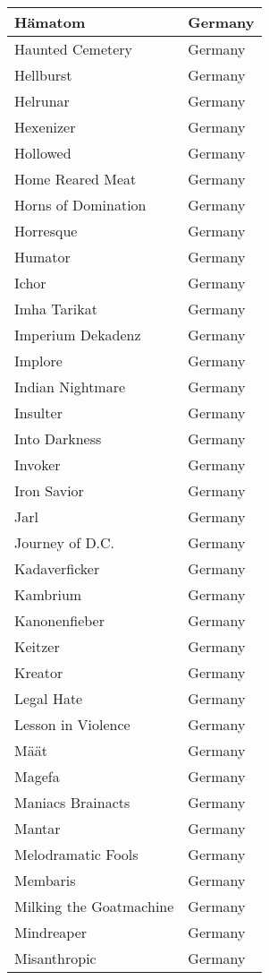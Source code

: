 \documentclass[12pt, a4paper, twoside]{report}
\begin{document}
\begin{center}
\begin{longtable}{|p{5cm}|p{5cm}|}
Hämatom & Germany \\ \hline
Haunted Cemetery & Germany \\ \hline
Hellburst & Germany \\ \hline
Helrunar & Germany \\ \hline
Hexenizer & Germany \\ \hline
Hollowed & Germany \\ \hline
Home Reared Meat & Germany \\ \hline
Horns of Domination & Germany \\ \hline
Horresque & Germany \\ \hline
Humator & Germany \\ \hline
Ichor & Germany \\ \hline
Imha Tarikat & Germany \\ \hline
Imperium Dekadenz & Germany \\ \hline
Implore & Germany \\ \hline
Indian Nightmare & Germany \\ \hline
Insulter & Germany \\ \hline
Into Darkness & Germany \\ \hline
Invoker & Germany \\ \hline
Iron Savior & Germany \\ \hline
Jarl & Germany \\ \hline
Journey of D.C. & Germany \\ \hline
Kadaverficker & Germany \\ \hline
Kambrium & Germany \\ \hline
Kanonenfieber & Germany \\ \hline
Keitzer & Germany \\ \hline
Kreator & Germany \\ \hline
Legal Hate & Germany \\ \hline
Lesson in Violence & Germany \\ \hline
Määt & Germany \\ \hline
Magefa & Germany \\ \hline
Maniacs Brainacts & Germany \\ \hline
Mantar & Germany \\ \hline
Melodramatic Fools & Germany \\ \hline
Membaris & Germany \\ \hline
Milking the Goatmachine & Germany \\ \hline
Mindreaper & Germany \\ \hline
Misanthropic & Germany \\ \hline

\end{longtable}
\end{center}
\end{document}
